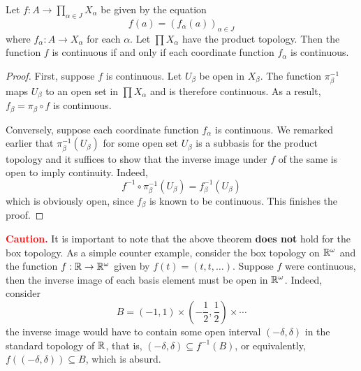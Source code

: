 \begin{theorem}
    Let $f:A\to\prod_{\alpha\in J}X_\alpha$ be given by the equation 
    \begin{equation*}
        f(a) = (f_\alpha(a))_{\alpha\in J}
    \end{equation*}
    where $f_\alpha:A\to X_\alpha$ for each $\alpha$. Let $\prod X_\alpha$ have the product topology. Then the function $f$ is continuous if and only if each coordinate function $f_\alpha$ is continuous.
\end{theorem}
\begin{proof}
    First, suppose $f$ is continuous. Let $U_\beta$ be open in $X_\beta$. The function $\pi^{-1}_\beta$ maps $U_\beta$ to an open set in $\prod X_\alpha$ and is therefore continuous. As a result, $f_\beta = \pi_\beta\circ f$ is continuous.

    Conversely, suppose each coordinate function $f_\alpha$ is continuous. We remarked earlier that $\pi_\beta^{-1}(U_\beta)$ for some open set $U_\beta$ is a subbasis for the product topology and it suffices to show that the inverse image under $f$ of the same is open to imply continuity. Indeed, 
    \begin{equation*}
        f^{-1}\circ\pi^{-1}_\beta(U_\beta) = f_\beta^{-1}(U_\beta)
    \end{equation*}
    which is obviously open, since $f_\beta$ is known to be continuous. This finishes the proof.
\end{proof}

\begin{mdframed}
    \textbf{\textcolor{red}{Caution.}} It is important to note that the above theorem \textbf{does not} hold for the box topology. As a simple counter example, consider the box topology on $\mathbb{R}^\omega$ and the function $f:\mathbb{R}\to\mathbb{R}^\omega$ given by $f(t)=(t,t,\ldots)$. Suppose $f$ were continuous, then the inverse image of each basis element must be open in $\mathbb{R}^\omega$. Indeed, consider 
    \begin{equation*}
        B = (-1,1)\times(-\frac{1}{2},\frac{1}{2})\times\cdots
    \end{equation*}
    the inverse image would have to contain some open interval $(-\delta,\delta)$ in the standard topology of $\mathbb{R}$, that is, $(-\delta,\delta)\subseteq f^{-1}(B)$, or equivalently, $f((-\delta,\delta))\subseteq B$, which is absurd.
\end{mdframed}

